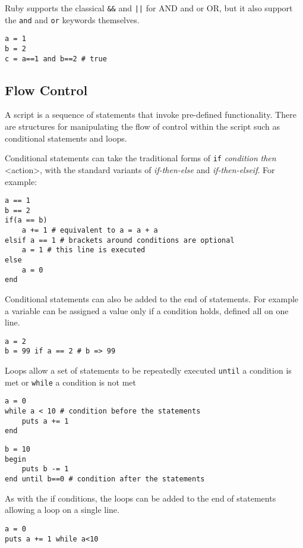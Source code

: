 \begin{bibunit}
Ruby supports the classical \texttt{\&\&} and \texttt{||} for AND and or OR, but it also support the \texttt{and} and \texttt{or} keywords themselves.

\begin{lstlisting}
a = 1
b = 2
c = a==1 and b==2 # true
\end{lstlisting}

\subsection{Flow Control}
A script is a sequence of statements that invoke pre-defined functionality. There are structures for manipulating the flow of control within the script such as conditional statements and loops.

Conditional statements can take the traditional forms of \texttt{if} \emph{condition} \emph{then} <action>, with the standard variants of \emph{if-then-else} and \emph{if-then-elseif}. For example:

\begin{lstlisting}
a == 1
b == 2
if(a == b) 
	a += 1 # equivalent to a = a + a
elsif a == 1 # brackets around conditions are optional
	a = 1 # this line is executed
else 
 	a = 0
end
\end{lstlisting}

Conditional statements can also be added to the end of statements. For example a variable can be assigned a value only if a condition holds, defined all on one line.

\begin{lstlisting}
a = 2
b = 99 if a == 2 # b => 99
\end{lstlisting}

Loops allow a set of statements to be repeatedly executed \texttt{until} a condition is met or \texttt{while} a condition is not met

\begin{lstlisting}
a = 0
while a < 10 # condition before the statements
	puts a += 1
end
\end{lstlisting}

\begin{lstlisting}
b = 10
begin 
	puts b -= 1
end until b==0 # condition after the statements
\end{lstlisting}

As with the if conditions, the loops can be added to the end of statements allowing a loop on a single line.

\begin{lstlisting}
a = 0
puts a += 1 while a<10
\end{lstlisting}


\end{bibunit}
